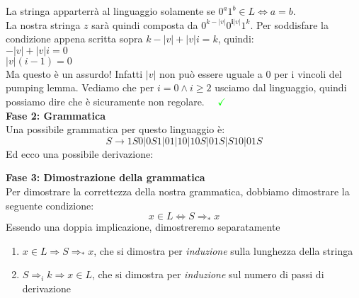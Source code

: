 \documentclass[a4paper,oneside]{scrbook}
\newcommand{\greenmark}{\quad \textcolor{green}{\checkmark}}
\newcommand{\blue}[1]{\textcolor{blue}{#1}}
\begin{document}
La stringa apparterrà al linguaggio solamente se $0^a1^b\in L \Leftrightarrow a=b$.\\
La nostra stringa $z$ sarà quindi composta da $0^{k-|v|}0^{\textbf{i}|v|}1^k$. Per soddisfare la condizione appena scritta sopra $k-|v|+|v|i=k$, quindi:\\
$-|v|+|v|i=0$\\
$|v|(i-1)=0$\\
Ma questo è un assurdo! Infatti $|v|$ non può essere uguale a $0$ per i vincoli del pumping lemma.
Vediamo che per $i=0 \wedge i\geq2$ usciamo dal linguaggio, quindi possiamo dire che è sicuramente non regolare. $\greenmark$\\
\textbf{Fase 2: Grammatica}\\
Una possibile grammatica per questo linguaggio è:
$$S \rightarrow 1S0|0S1|01|10|10S|01S|S10|01S$$
Ed ecco una possibile derivazione:
\begin{center}
\end{center}
\textbf{Fase 3: Dimostrazione della grammatica}\\
Per dimostrare la correttezza della nostra grammatica, dobbiamo dimostrare la seguente condizione:
$$x\in L \Leftrightarrow S \Rightarrow_* x$$
Essendo una doppia implicazione, dimostreremo separatamente
\begin{enumerate}
	\item $x\in L \Rightarrow S \Rightarrow_* x $, che si dimostra per \textit{induzione} sulla lunghezza della stringa
	\item $ S \Rightarrow_i k \Rightarrow x \in L$, che si dimostra per \textit{induzione} sul numero di passi di derivazione
\end{enumerate}
\end{document}
